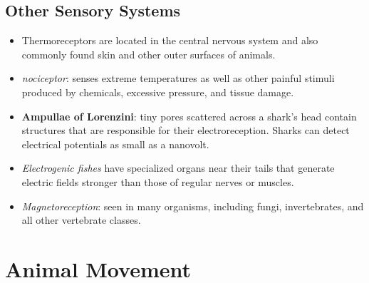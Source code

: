 \documentclass[12pt,a4paper]{article}
\begin{document}
\subsection{Other Sensory Systems}
\begin{itemize}
    \item Thermoreceptors are located in the central nervous system and also commonly found skin and other outer surfaces of animals. 
    \item \textit{nociceptor}: senses extreme temperatures as well as other painful stimuli produced by chemicals, excessive pressure, and tissue damage.
    \item \textbf{Ampullae of Lorenzini}: tiny pores scattered across a shark's head contain structures that are responsible for their electroreception. Sharks can detect electrical potentials as small as a nanovolt.
    \item \textit{Electrogenic fishes} have specialized organs near their tails that generate electric fields stronger than those of regular nerves or muscles. 
    \item \textit{Magnetoreception}: seen in many organisms, including fungi, invertebrates, and all other vertebrate classes.
\end{itemize}


\clearpage
\section{Animal Movement}
\end{document}
